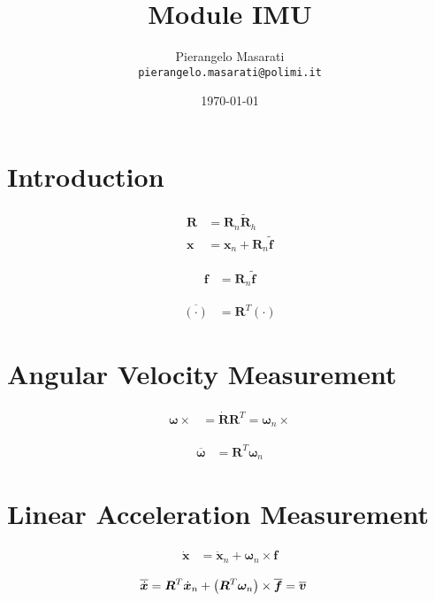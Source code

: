 \documentclass{article}
\newcommand{\T}[1]{\bm{#1}}
\newcommand{\TT}[1]{\bm{#1}}
\begin{document}
\title{Module IMU}
\author{Pierangelo Masarati \\ \texttt{pierangelo.masarati@polimi.it}}
\date{\today}
\maketitle


\section{Introduction}
\begin{subequations}
\begin{align}
	\TT{R}
	&=
	\TT{R}_n \tilde{\TT{R}}_h
	\\
	\T{x}
	&=
	\T{x}_n
	+
	\TT{R}_n \tilde{\T{f}}
\end{align}
\end{subequations}

\begin{align}
	\T{f}
	&=
	\TT{R}_n \tilde{\T{f}}
\end{align}

\begin{align}
	\overline{(\cdot)}
	&=
	\TT{R}^T (\cdot)
\end{align}

\section{Angular Velocity Measurement}
\begin{align}
	\T{\omega}\times{}
	&=
	\dot{\TT{R}}\TT{R}^T
	=
	\T{\omega}_n\times{}
\end{align}

\begin{align}
	\overline{\T{\omega}}
	&=
	\TT{R}^T \T{\omega}_n
\end{align}

\section{Linear Acceleration Measurement}
\begin{align}
	\dot{\T{x}}
	&=
	\dot{\T{x}}_n
	+
	\T{\omega}_n \times \T{f}
\end{align}

\begin{align}
	\overline{\dot{\T{x}}}
	&=
	\TT{R}^T \dot{\T{x}}_n
	+
	\plbr{\TT{R}^T \T{\omega}_n} \times \overline{\T{f}}
	=
	\overline{\T{v}}
\end{align}
\end{document}
